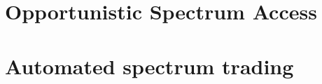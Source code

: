 \documentclass[12pt,a4paper,twoside]{memoir}
\begin{document}


\frontmatter
\clearpage
\tableofcontents
\clearpage
\listoffigures
\clearpage
\listoftables
\clearpage


\mainmatter

\part{Opportunistic Spectrum Access}\label{part_OSA}






\part{Automated spectrum trading}\label{part_auto}





%
\backmatter
{}

%
%

\end{document}
